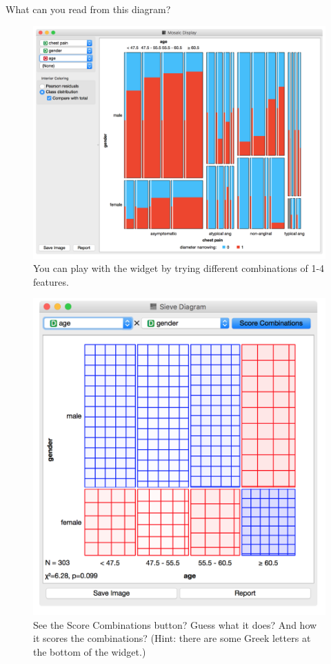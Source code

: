 \newpage
What can you read from this diagram?

\begin{figure}[h]
  \centering
  \includegraphics[width=\linewidth]{basic_data_exploration-fig6.png}
  \caption{You can play with the widget by trying different combinations of 1-4 features.}
  \label{fig:basic_data_exploration-fig6}
\end{figure}

\begin{figure}
  \includegraphics[scale=0.6]{basic_data_exploration-fig7.png}
  \caption{See the Score Combinations button? Guess what it does? And how it scores the combinations? (Hint: there are some Greek letters at the bottom of the widget.)}
\end{figure}

